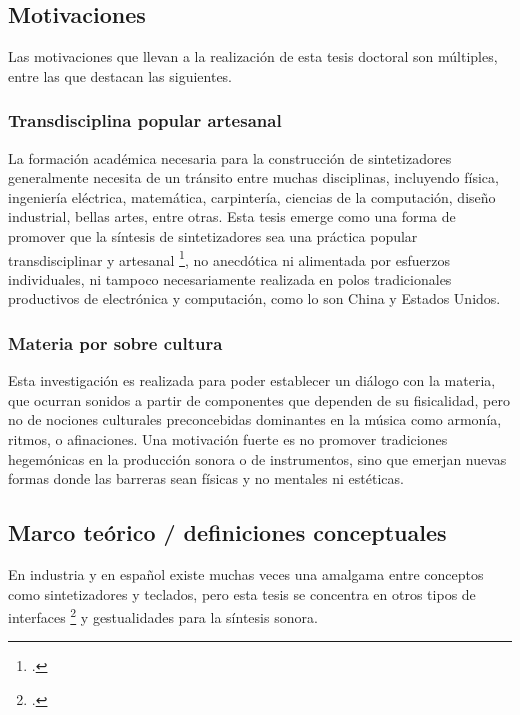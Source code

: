 \documentclass[../candidatura.tex]{subfiles}
\begin{document}
\subsection{Motivaciones}

Las motivaciones que llevan a la realización de esta tesis doctoral son múltiples, entre las que destacan las siguientes.

\subsubsection{Transdisciplina popular artesanal}

La formación académica necesaria para la construcción de sintetizadores generalmente necesita de un tránsito entre muchas disciplinas, incluyendo física, ingeniería eléctrica, matemática, carpintería, ciencias de la computación, diseño industrial, bellas artes, entre otras. Esta tesis emerge como una forma de promover que la síntesis de sintetizadores sea una práctica popular transdisciplinar y artesanal \footcite{collins_handmade_2020}, no anecdótica ni alimentada por esfuerzos individuales, ni tampoco necesariamente realizada en polos tradicionales productivos de electrónica y computación, como lo son China y Estados Unidos.

\subsubsection{Materia por sobre cultura}

Esta investigación es realizada para poder establecer un diálogo con la materia, que ocurran sonidos a partir de componentes que dependen de su fisicalidad, pero no de nociones culturales preconcebidas dominantes en la música como armonía, ritmos, o afinaciones. Una motivación fuerte es no promover tradiciones hegemónicas en la producción sonora o de instrumentos, sino que emerjan nuevas formas donde las barreras sean físicas y no mentales ni estéticas.

\subsection{Marco teórico / definiciones conceptuales}
\label{subsec:marco-teorico}


En industria y en español existe muchas veces una amalgama entre conceptos como sintetizadores y teclados, pero esta tesis se concentra en otros tipos de interfaces \footcite{bjorn_push_2021} y gestualidades para la síntesis sonora.
\end{document}
